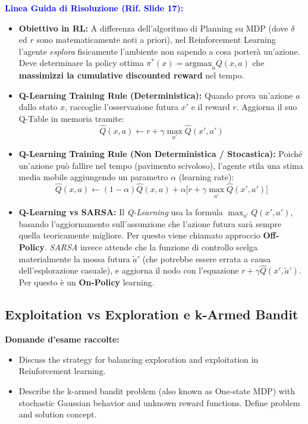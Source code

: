 \documentclass[11pt,a4paper]{article}
\begin{document}
\textbf{\textcolor{blue}{Linea Guida di Risoluzione (Rif. Slide 17):}}
\begin{itemize}
    \item \textbf{Obiettivo in RL:} A differenza dell'algoritmo di Planning su MDP (dove $\delta$ ed $r$ sono matematicamente noti a priori), nel Reinforcement Learning l'agente \textit{esplora} fisicamente l'ambiente non sapendo a cosa porterà un'azione. Deve determinare la policy ottima $\pi^*(x) = \text{argmax}_a Q(x, a)$ che \textbf{massimizzi la cumulative discounted reward} nel tempo.
    \item \textbf{Q-Learning Training Rule (Deterministica):} Quando prova un'azione $a$ dallo stato $x$, raccoglie l'osservazione futura $x'$ e il reward $r$. Aggiorna il suo Q-Table in memoria tramite:
    $$ \hat{Q}(x, a) \leftarrow r + \gamma \max_{a'} \hat{Q}(x', a') $$
    \item \textbf{Q-Learning Training Rule (Non Deterministica / Stocastica):} Poiché un'azione può fallire nel tempo (pavimento scivoloso), l'agente stila una stima media mobile aggiungendo un parametro $\alpha$ (learning rate):
    $$ \hat{Q}(x, a) \leftarrow (1-\alpha)\hat{Q}(x, a) + \alpha \Big[ r + \gamma \max_{a'} \hat{Q}(x', a') \Big] $$
    \item \textbf{Q-Learning vs SARSA:} Il \textit{Q-Learning} usa la formula $\max_{a'} Q(x',a')$, basando l'aggiornamento sull'assunzione che l'azione futura sarà sempre quella teoricamente migliore. Per questo viene chiamato approccio \textbf{Off-Policy}. \textit{SARSA} invece attende che la funzione di controllo scelga materialmente la mossa futura $\tilde{a}'$ (che potrebbe essere errata a causa dell'esplorazione casuale), e aggiorna il nodo con l'equazione $r + \gamma \hat{Q}(x', \tilde{a}')$. Per questo è un \textbf{On-Policy} learning.
\end{itemize}

\subsection{Exploitation vs Exploration e k-Armed Bandit}
\textbf{Domande d'esame raccolte:}
\begin{itemize}
    \item Discuss the strategy for balancing exploration and exploitation in Reinforcement learning.
    \item Describe the k-armed bandit problem (also known as One-state MDP) with stochastic Gaussian behavior and unknown reward functions. Define problem and solution concept.
\end{itemize}
\end{document}
